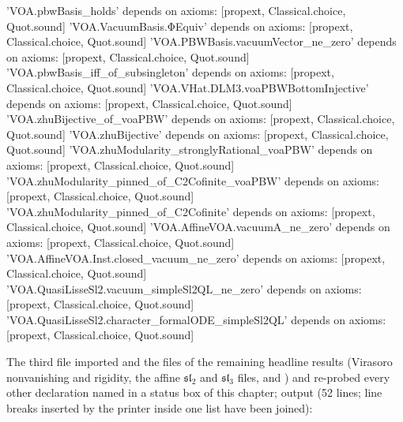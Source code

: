 \begin{plaincode}
'VOA.pbwBasis_holds' depends on axioms: [propext, Classical.choice, Quot.sound]
'VOA.VacuumBasis.ΦEquiv' depends on axioms: [propext, Classical.choice, Quot.sound]
'VOA.PBWBasis.vacuumVector_ne_zero' depends on axioms: [propext, Classical.choice, Quot.sound]
'VOA.pbwBasis_iff_of_subsingleton' depends on axioms: [propext, Classical.choice, Quot.sound]
'VOA.VHat.DLM3.voaPBWBottomInjective' depends on axioms: [propext, Classical.choice, Quot.sound]
'VOA.zhuBijective_of_voaPBW' depends on axioms: [propext, Classical.choice, Quot.sound]
'VOA.zhuBijective' depends on axioms: [propext, Classical.choice, Quot.sound]
'VOA.zhuModularity_stronglyRational_voaPBW' depends on axioms: [propext, Classical.choice, Quot.sound]
'VOA.zhuModularity_pinned_of_C2Cofinite_voaPBW' depends on axioms: [propext, Classical.choice, Quot.sound]
'VOA.zhuModularity_pinned_of_C2Cofinite' depends on axioms: [propext, Classical.choice, Quot.sound]
'VOA.AffineVOA.vacuumA_ne_zero' depends on axioms: [propext, Classical.choice, Quot.sound]
'VOA.AffineVOA.Inst.closed_vacuum_ne_zero' depends on axioms: [propext, Classical.choice, Quot.sound]
'VOA.QuasiLisseSl2.vacuum_simpleSl2QL_ne_zero' depends on axioms: [propext, Classical.choice, Quot.sound]
'VOA.QuasiLisseSl2.character_formalODE_simpleSl2QL' depends on axioms: [propext, Classical.choice, Quot.sound]
\end{plaincode}
The third file imported  and the files of the remaining headline results
(Virasoro nonvanishing and rigidity, the affine $\mathfrak{sl}_2$ and $\mathfrak{sl}_3$ files, and
) and re-probed every other declaration named in a status box of this chapter;
output (52 lines; line breaks inserted by the printer inside one list have been joined):
